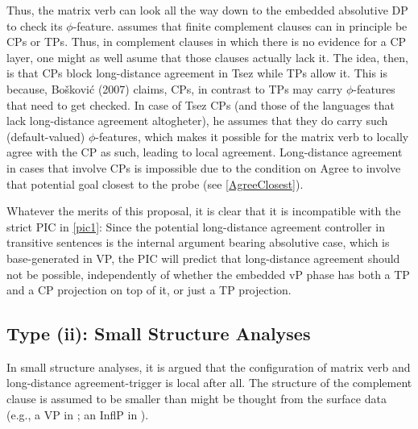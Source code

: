 \documentclass[output=paper
,modfonts
,nonflat]{langsci/langscibook}
\begin{document}
Thus, the matrix verb can look all the way
down to the embedded absolutive DP to check its
$\phi$-feature. \citet{Boskovic:07} assumes that finite complement
clauses can in principle be CPs or TPs. Thus, in complement clauses in
which there is no evidence for a CP layer, one might as well asume
that those clauses actually lack it.
The idea, then, is that CPs block long-distance agreement in Tsez while TPs allow it. This
is because, Bo\v{s}kovi{\'c} (2007) claims, CPs, in contrast to TPs
may carry $\phi$-features that need to get checked. In case of Tsez
CPs (and those of the languages that lack long-distance agreement altogheter), he assumes
that they do carry such (default-valued) $\phi$-features, which makes it possible for
the matrix verb to locally agree with the CP as such, leading to local
agreement. Long-distance agreement in cases that involve CPs is impossible due to the
condition on Agree to involve that potential goal closest to the probe
(see \ref{AgreeClosest}).

Whatever the merits of this proposal, it is clear that it is
incompatible with the strict PIC in \ref{pic1}: 
 Since the potential long-distance agreement controller  in
transitive sentences is the internal argument bearing absolutive case, which is base-generated
in VP, the PIC will predict that long-distance agreement should not be
possible, independently of whether the embedded vP phase has both a TP
and a CP projection on top of it, or just a TP projection. 

\subsection{Type (ii): Small Structure Analyses}

In small structure analyses, it is argued that the configuration of matrix verb
and long-distance agree\-ment-trigger is local after all. The structure
of the complement clause is assumed to be smaller than might be
thought from the surface data (e.g., a VP in \cite{Boeckx:04}; an
InflP in \cite{Bhatt:05}).
\end{document}
